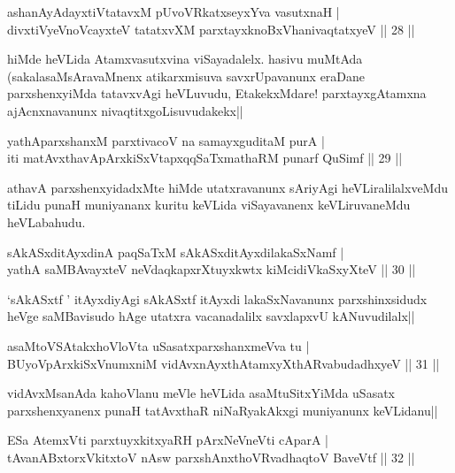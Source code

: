 \begin{shl}
ashanAyAdayxtiVtatavxM pUvoVRkatxseyxYva vasutxnaH |\\
divxtiVyeVnoVcayxteV tatatxvXM parxtayxknoBxVhanivaqtatxyeV \hfill || 28 ||
\end{shl}

\begin{artha}
hiMde heVLida Atamxvasutxvina viSayadalelx. hasivu muMtAda (sakalasaMsAravaMnenx atikarxmisuva savxrUpavanunx eraDane parxshenxyiMda tatavxvAgi heVLuvudu, EtakekxMdare! parxtayxgAtamxna ajAcnxnavanunx nivaqtitxgoLisuvudakekx||
\end{artha}

\begin{shl}
yathAparxshanxM parxtivacoV na samayxguditaM purA |\\
iti matAvx\s thavA\s pArxkiSxVtapxqqSaTxmathaRM punarf QuSimf \hfill || 29 ||
\end{shl}

\begin{artha}
athavA parxshenxyidadxMte hiMde utatxravanunx sAriyAgi heVLiralilalxveMdu tiLidu punaH muniyananx kuritu keVLida viSayavanenx keVLiruvaneMdu heVLabahudu.
\end{artha}

\begin{shl}
sAkASxditAyxdinA paqSaTxM sAkASxditAyxdilakaSxNamf |\\
yathA saMBAvayxteV neVdaqkapxrXtuyxkwtx kiMcidiVkaSxyXteV \hfill || 30 ||
\end{shl}

\begin{artha}%
`sAkASxtf ' itAyxdiyAgi sAkASxtf itAyxdi lakaSxNavanunx parxshinxsidudx heVge saMBavisudo hAge utatxra vacanadalilx  savxlapxvU kANuvudilalx||
\end{artha}

\begin{shl}
asaMtoVSAtakxhoVloV\s ta uSasatxparxshanxmeVva tu |\\
BUyoV\s pArxkiSxVnumxniM vidAvxnAyxthAtamxyXthARvabudadhxyeV \hfill || 31 ||
\end{shl}

\begin{artha}
vidAvxMsanAda kahoVlanu meVle heVLida asaMtuSitxYiMda uSasatx parxshenxyanenx punaH tatAvxthaR niNaRyakAkxgi muniyanunx keVLidanu||
\end{artha}


\begin{shl}
ESa AtemxVti parxtuyxkitxyaRH pArxNeVneVti cAparA |\\
tAvanABxtorxVkitxtoV nAsw parxshAnxthoVR\s vadhaqtoV BaveVtf \hfill || 32 ||
\end{shl}

